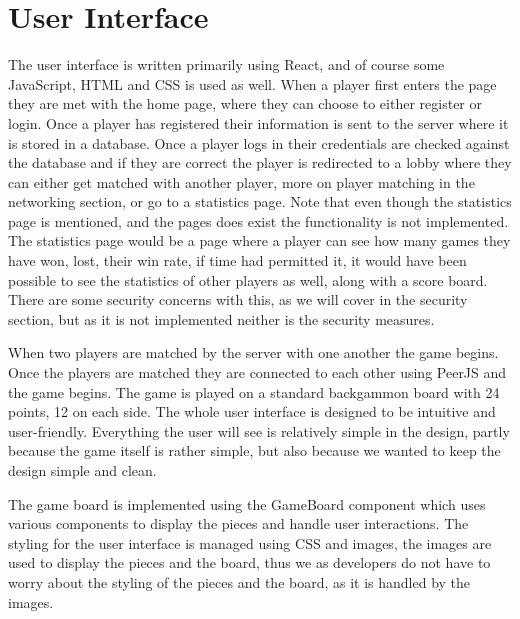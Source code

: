 \documentclass[ twoside,openright,titlepage,numbers=noenddot,headinclude,%
                footinclude=true,cleardoublepage=empty,abstractoff, %
                BCOR=5mm,paper=a4,fontsize=11pt,%
                ngerman,american,%
                ]{scrreprt}
\begin{document}
\section{User Interface}
The user interface is written primarily using React, and of course some JavaScript, HTML and CSS is used as well. When a player first enters the page they are met with the home page, where they can choose to either register or login. Once a player has registered their information is sent to the server where it is stored in a database. Once a player logs in their credentials are checked against the database and if they are correct the player is redirected to a lobby where they can either get matched with another player, more on player matching in the networking section, or go to a statistics page. Note that even though the statistics page is mentioned, and the pages does exist the functionality is not implemented. The statistics page would be a page where a player can see how many games they have won, lost, their win rate, if time had permitted it, it would have been possible to see the statistics of other players as well, along with a score board. There are some security concerns with this, as we will cover in the security section, but as it is not implemented neither is the security measures. 

When two players are matched by the server with one another the game begins. Once the players are matched they are connected to each other using PeerJS and the game begins.
The game is played on a standard backgammon board with 24 points, 12 on each side. The whole user interface is designed to be intuitive and user-friendly. Everything the user will see is relatively simple in the design, partly because the game itself is rather simple, but also because we wanted to keep the design simple and clean. 

The game board is implemented using the GameBoard component which uses various components to display the pieces and handle user interactions. The styling for the user interface is managed using CSS and images, the images are used to display the pieces and the board, thus we as developers do not have to worry about the styling of the pieces and the board, as it is handled by the images.  
\end{document}

